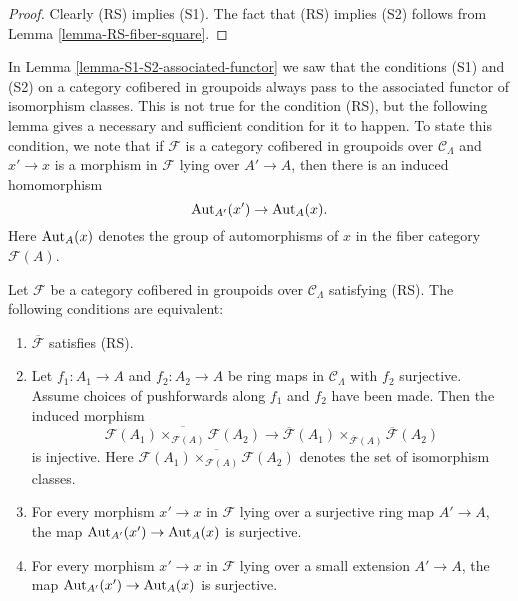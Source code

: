 \begin{proof}
Clearly (RS) implies (S1).  The fact that (RS) implies (S2) follows from Lemma 
\ref{lemma-RS-fiber-square}.
\end{proof}

\noindent
In Lemma \ref{lemma-S1-S2-associated-functor} we saw that the conditions (S1) 
and (S2) on a category cofibered in groupoids always pass to the associated 
functor of isomorphism classes. This is not true for the condition (RS), but 
the following lemma gives a necessary and sufficient condition for it to 
happen.  To state this condition, we note that if $\mathcal F$ is a category 
cofibered in groupoids over $\mathcal C_{\Lambda}$ and $x' \rightarrow x$ is a 
morphism in $\mathcal F$ lying over $A' \rightarrow A$, then there is an 
induced homomorphism
\[ \textnormal{Aut}_{A'}(x') \rightarrow \textnormal{Aut}_{A}(x). \]
Here $\textnormal{Aut}_{A}(x)$ denotes the group of automorphisms of $x$ in the 
fiber category $\mathcal F(A)$.

\begin{lemma}
\label{lemma-RS-associated-functor}
Let $\mathcal F$ be a category cofibered in groupoids over $\mathcal 
C_{\Lambda}$ satisfying \textnormal{(RS)}.  The following conditions are 
equivalent: 
\begin{enumerate}
\item $\overline{\mathcal F}$ satisfies \textnormal{(RS)}.
\item Let $f_1: A_1 \rightarrow A$ and $f_2: A_2 \rightarrow A$ be ring maps in 
$\mathcal C_{\Lambda}$ with $f_2$ surjective. Assume choices of pushforwards 
along $f_1$ and $f_2$ have been made.  Then the induced morphism
\[
\overline{\mathcal F(A_1) \times_{\mathcal F(A)} \mathcal F(A_2)}
\rightarrow \overline{\mathcal F}(A_1) \times_{\overline{\mathcal F}(A)} 
\overline{\mathcal F}(A_2)
\]
is injective.  Here $ \overline{\mathcal F(A_1) \times_{\mathcal F(A)} \mathcal 
F(A_2)}$ denotes the set of isomorphism classes.
\item For every morphism $x' \rightarrow x$ in $\mathcal F$ lying over a 
surjective ring map $A' \rightarrow A$, the map $\textnormal{Aut}_{A'}(x') 
\rightarrow \textnormal{Aut}_{A}(x)$ is surjective.
\item For every morphism $x' \rightarrow x$ in $\mathcal F$ lying over a small 
extension $A' \rightarrow A$, the map $\textnormal{Aut}_{A'}(x') \rightarrow 
\textnormal{Aut}_{A}(x)$ is surjective.
\end{enumerate}
\end{lemma}

